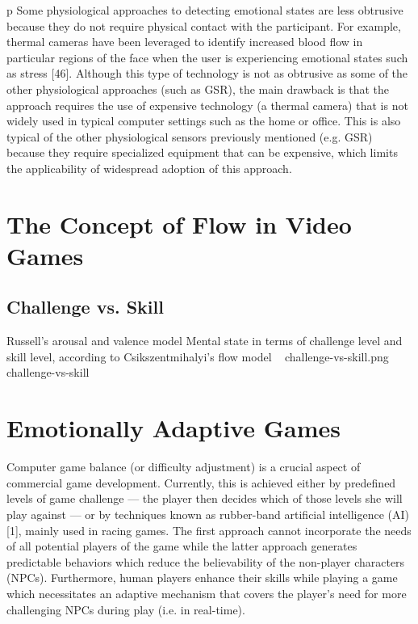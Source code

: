 \documentclass{uofsthesis-cs}
\begin{document}
p Some physiological approaches to detecting emotional states are less obtrusive because they do not require physical contact with the participant. For example, thermal cameras have been leveraged to identify increased blood flow in particular regions of the face when the user is experiencing emotional states such as stress [46]. Although this type of technology is not as obtrusive as some of the other physiological approaches (such as GSR), the main drawback is that the approach requires the use of expensive technology (a thermal camera) that is not widely used in typical computer settings such as the home or office. This is also typical of the other physiological sensors previously mentioned (e.g. GSR) because they require specialized equipment that can be expensive, which limits the applicability of widespread adoption of this approach. 


\section{The Concept of Flow in Video Games}

\subsection{Challenge vs. Skill}

\img
{Russell's arousal and valence model}
{Mental state in terms of challenge level and skill level, according to Csikszentmihalyi's flow model ~\cite{csikszentmihalyi1997finding}}
{challenge-vs-skill.png}
{challenge-vs-skill}

\section{Emotionally Adaptive Games}

Computer game balance (or difficulty adjustment) is a
crucial aspect of commercial game development. Currently,
this is achieved either by predefined levels of game challenge
— the player then decides which of those levels she will play
against — or by techniques known as rubber-band artificial
intelligence (AI) [1], mainly used in racing games. The
first approach cannot incorporate the needs of all potential
players of the game while the latter approach generates
predictable behaviors which reduce the believability of the
non-player characters (NPCs). Furthermore, human players
enhance their skills while playing a game which necessitates
an adaptive mechanism that covers the player’s need for more
challenging NPCs during play (i.e. in real-time).
\end{document}
